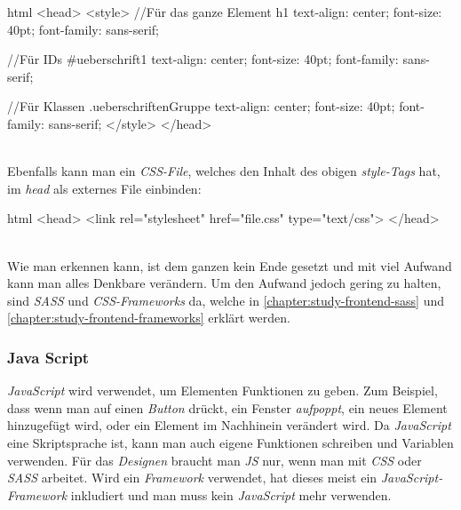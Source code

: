 		\begin{code}{html}
				<head>
					<style>
					//Für das ganze Element
					h1 {
						text-align: center; 
						font-size: 40pt; 
						font-family: sans-serif;
					}
				
					//Für IDs
					#ueberschrift1 {
						text-align: center; 
						font-size: 40pt; 
						font-family: sans-serif;
					}
					
					//Für Klassen
					.ueberschriftenGruppe {
						text-align: center; 
						font-size: 40pt; 
						font-family: sans-serif;
					}
					</style>
				</head>
		\end{code}
	\label{list:cssbsp} ~\\
		Ebenfalls kann man ein \textit{CSS-File}, welches den Inhalt des obigen \textit{style-Tags} hat, im \textit{head} als externes File einbinden:
		\begin{code}{html}
			<head>
				<link rel="stylesheet" href="file.css" type="text/css">
			</head>
		\end{code}
	\label{list:csslink} ~\\
		Wie man erkennen kann, ist dem ganzen kein Ende gesetzt und mit viel Aufwand kann man alles Denkbare verändern. Um den Aufwand jedoch gering zu halten, sind \textit{SASS} und \textit{CSS-Frameworks} da, welche in \autoref{chapter:study-frontend-sass} und \autoref{chapter:study-frontend-frameworks} erklärt werden.
		\subsubsection{Java Script}
		\label{chapter:study-frontend-js}
		\textit{JavaScript} wird verwendet, um Elementen Funktionen zu geben. Zum Beispiel, dass wenn man auf einen \textit{Button} drückt, ein Fenster \textit{aufpoppt}, ein neues Element hinzugefügt wird, oder ein Element im Nachhinein verändert wird. Da \textit{JavaScript} eine Skriptsprache ist, kann man auch eigene Funktionen schreiben und Variablen verwenden. Für das \textit{Designen} braucht man \textit{JS} nur, wenn man mit \textit{CSS} oder \textit{SASS} arbeitet. Wird ein \textit{Framework} verwendet, hat dieses meist ein \textit{JavaScript-Framework} inkludiert und man muss kein \textit{JavaScript} mehr verwenden.
